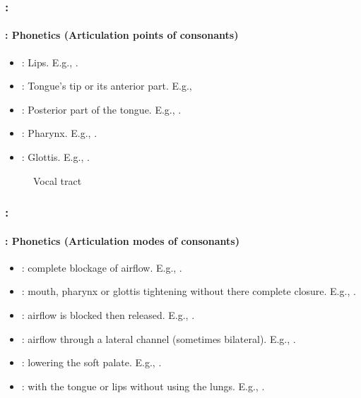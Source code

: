 \documentclass[xcolor=table]{beamer}
\begin{document}
\begin{frame}
	\frametitle{\insertshortsubtitle: \insertsection}
	\framesubtitle{\insertsubsection: Phonetics (Articulation points of consonants)}

	\begin{minipage}{0.55\textwidth}
	\begin{itemize}
		\item {}: Lips. E.g., \expword{\textipa{[b], [p], [m], [f], [v]}}.
		\item {}: Tongue's tip or its anterior part. 
		E.g., 
		\item {}: Posterior part of the tongue. E.g., .
		\item {}: Pharynx. 
		E.g., .
		\item {}: Glottis. 
		E.g., .
	\end{itemize}
	\end{minipage}
	\begin{minipage}{0.43\textwidth}
		\begin{figure}
			\caption{Vocal tract \cite{2009-ball}}
		\end{figure}
	\end{minipage}

\end{frame}

\begin{frame}
	\frametitle{\insertshortsubtitle: \insertsection}
	\framesubtitle{\insertsubsection: Phonetics (Articulation modes of consonants)}

	\begin{itemize}
		\item {}: complete blockage of airflow.
		E.g., \expword{\textipa{[p], [k], [b], [m], [n]}}.
		
		\item {}: mouth, pharynx or glottis tightening without there complete closure.
		E.g., \expword{\textipa{[f], [v], [s]}}.
		
		\item {}: airflow is blocked then released.
		E.g., \expword{\textipa{[\t{\textteshlig}]}}.
		
		\item {}: airflow through a lateral channel (sometimes bilateral).
		E.g., \expword{\textipa{[l]}}.
		
		\item {}: lowering the soft palate.
		E.g., \expword{\textipa{[m], [n]}}.
		
		\item {}: with the tongue or lips without using the lungs.
		E.g., .
		
	\end{itemize}

\end{frame}
\end{document}
